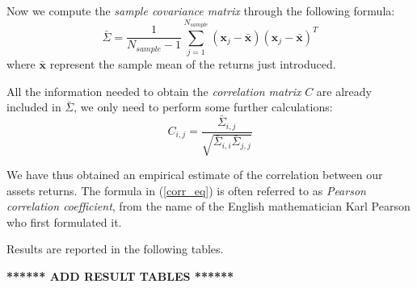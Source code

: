 Now we compute the \textit{sample covariance matrix} through the following formula:
\begin{equation*}
\bar{\Sigma}  = \frac{1}{N_{sample}-1} \sum_{j=1}^{N_{sample}} (\mathbf{x}_j - \mathbf{\bar{x}}) (\mathbf{x}_j - \mathbf{\bar{x}})^T
\end{equation*}
where $\mathbf{\bar{x}}$ represent the sample mean of the returns just introduced.
	
All the information needed to obtain the \textit{correlation matrix} $C$ are already included in $\bar{\Sigma}$, we only need to perform some further calculations:
\begin{equation}
\label{corr_eq}
	C_{i,j} = \frac{\bar{\Sigma}_{i,j}}{\sqrt{\bar{\Sigma}_{i,i} \bar{\Sigma}_{j,j}}}
\end{equation}

We have thus obtained an empirical estimate of the correlation between our assets returns. The formula in (\ref{corr_eq}) is often referred to as \textit{Pearson correlation coefficient}, from the name of the English mathematician Karl Pearson who first formulated it.

Results are reported in the following tables.

\begin{center}
	\textbf{****** ADD RESULT TABLES ******}
\end{center}

